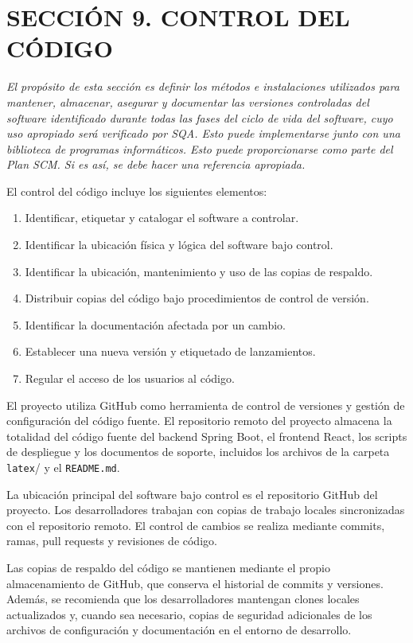 ﻿\section{SECCIÓN 9. CONTROL DEL CÓDIGO}
\textit{El propósito de esta sección es definir los métodos e instalaciones utilizados para mantener, almacenar, asegurar y documentar las versiones controladas del software identificado durante todas las fases del ciclo de vida del software, cuyo uso apropiado será verificado por SQA. Esto puede implementarse junto con una biblioteca de programas informáticos. Esto puede proporcionarse como parte del Plan SCM. Si es así, se debe hacer una referencia apropiada.}

El control del código incluye los siguientes elementos:
\begin{enumerate}
    \item Identificar, etiquetar y catalogar el software a controlar.
    \item Identificar la ubicación física y lógica del software bajo control.
    \item Identificar la ubicación, mantenimiento y uso de las copias de respaldo.
    \item Distribuir copias del código bajo procedimientos de control de versión.
    \item Identificar la documentación afectada por un cambio.
    \item Establecer una nueva versión y etiquetado de lanzamientos.
    \item Regular el acceso de los usuarios al código.
\end{enumerate}

El proyecto utiliza GitHub como herramienta de control de versiones y gestión de configuración del código fuente. El repositorio remoto del proyecto almacena la totalidad del código fuente del backend Spring Boot, el frontend React, los scripts de despliegue y los documentos de soporte, incluidos los archivos de la carpeta \texttt{latex}/ y el \texttt{README.md}.

La ubicación principal del software bajo control es el repositorio GitHub del proyecto. Los desarrolladores trabajan con copias de trabajo locales sincronizadas con el repositorio remoto. El control de cambios se realiza mediante commits, ramas, pull requests y revisiones de código.

Las copias de respaldo del código se mantienen mediante el propio almacenamiento de GitHub, que conserva el historial de commits y versiones. Además, se recomienda que los desarrolladores mantengan clones locales actualizados y, cuando sea necesario, copias de seguridad adicionales de los archivos de configuración y documentación en el entorno de desarrollo.

